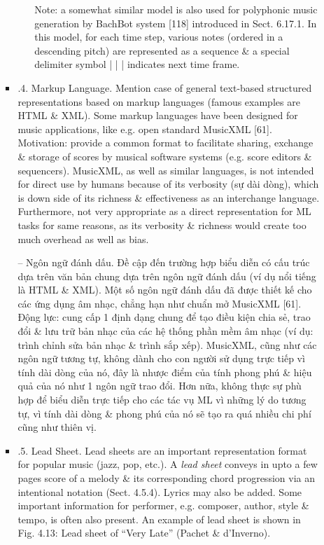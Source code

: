 \documentclass{article}
\begin{document}
\begin{itemize}
\begin{itemize}
\begin{itemize}
\begin{itemize}
				Note: a somewhat similar model is also used for polyphonic music generation by BachBot system [118] introduced in Sect. 6.17.1. In this model, for each time step, various notes (ordered in a descending pitch) are represented as a sequence \& a special delimiter symbol | | | indicates next time frame.
			\end{itemize}
			\item {.4. Markup Language.} Mention case of general text-based structured representations based on markup languages (famous examples are HTML \& XML). Some markup languages have been designed for music applications, like e.g. open standard MusicXML [61]. Motivation: provide a common format to facilitate sharing, exchange \& storage of scores by musical software systems (e.g. score editors \& sequencers). MusicXML, as well as similar languages, is not intended for direct use by humans because of its verbosity (sự dài dòng), which is down side of its richness \& effectiveness as an interchange language. Furthermore, not very appropriate as a direct representation for ML tasks for same reasons, as its verbosity \& richness would create too much overhead as well as bias.

			-- Ngôn ngữ đánh dấu. Đề cập đến trường hợp biểu diễn có cấu trúc dựa trên văn bản chung dựa trên ngôn ngữ đánh dấu (ví dụ nổi tiếng là HTML \& XML). Một số ngôn ngữ đánh dấu đã được thiết kế cho các ứng dụng âm nhạc, chẳng hạn như chuẩn mở MusicXML [61]. Động lực: cung cấp 1 định dạng chung để tạo điều kiện chia sẻ, trao đổi \& lưu trữ bản nhạc của các hệ thống phần mềm âm nhạc (ví dụ: trình chỉnh sửa bản nhạc \& trình sắp xếp). MusicXML, cũng như các ngôn ngữ tương tự, không dành cho con người sử dụng trực tiếp vì tính dài dòng của nó, đây là nhược điểm của tính phong phú \& hiệu quả của nó như 1 ngôn ngữ trao đổi. Hơn nữa, không thực sự phù hợp để biểu diễn trực tiếp cho các tác vụ ML vì những lý do tương tự, vì tính dài dòng \& phong phú của nó sẽ tạo ra quá nhiều chi phí cũng như thiên vị.
			\item {.5. Lead Sheet.} Lead sheets are an important representation format for popular music (jazz, pop, etc.). A {\it lead sheet} conveys in upto a few pages score of a melody \& its corresponding chord progression via an intentional notation (Sect. 4.5.4). Lyrics may also be added. Some important information for performer, e.g. composer, author, style \& tempo, is often also present. An example of lead sheet is shown in {\sf Fig. 4.13: Lead sheet of ``Very Late'' (Pachet \& d'Inverno).}


\end{itemize}
\end{itemize}
\end{itemize}
\end{document}

